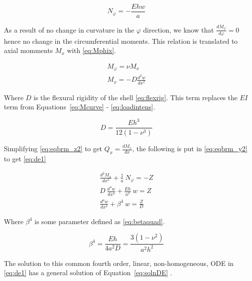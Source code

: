 \begin{equation}
	\label{eq:Nphi_simpl}
	N_\varphi = - \frac{Ehw}{a}
\end{equation}

As a result of no change in curvature in the $\varphi$ direction, we know that $\frac{dM_\varphi}{d\varphi}= 0$ hence no change in the circumferential moments. This relation is translated to axial momments $M_x$ with \ref{eq:Mphix}.

\begin{equation}
	\label{eq:Mphix}
	\begin{aligned}
	M_\varphi = \nu M_x\\
	M_x = -D \frac{d^2w}{dx^2}
	\end{aligned}
\end{equation}

Where $D$ is the flexural rigidity of the shell \ref{eq:flexrig}. This term replaces the $EI$ term from Equations~\ref{eq:Mcurve} - \ref{eq:loadintens}.


\begin{equation}
	\label{eq:flexrig}
	D = \frac{Eh^3}{12(1-\nu^3)}
\end{equation}

Simplifying \ref{eq:eqbrm_z2} to get $Q_x = \frac{dM_x}{dx}$, the following is put in \ref{eq:eqbrm_y2} to get \ref{eq:de1}

\begin{equation}
	\label{eq:de1}
	\begin{aligned}
	\frac{d^2M_x}{dx^2}+\frac{1}{a} \ N_\varphi = -Z\\
	D\ \frac{d^4w}{dx^4}+\frac{Eh}{a^2} \ w = Z\\
	\frac{d^4w}{dx^4}+\beta^4 \ w = \frac{Z}{D}
	\end{aligned}
\end{equation} 

Where $\beta^4$ is some parameter defined as \ref{eq:betaquad}.

\begin{equation}
	\label{eq:betaquad}
	\beta^4 = \frac{Eh}{4a^2D}= \frac{3(1-\nu^2)}{a^2h^2}
\end{equation}

The solution to this common fourth order, linear, non-homogeneous, ODE in \ref{eq:de1} has a general solution of Equation~\ref{eq:solnDE} \citep{timoshenko1959theory}.

